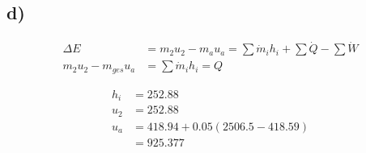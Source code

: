 

\subsection*{d)}

\begin{align*}
\Delta E &= m_{2} u_{2} - m_{a} u_{a} = \sum \dot{m}_{i} h_{i} + \sum \dot{Q} - \sum \dot{W} \\
m_{2} u_{2} - m_{ges} u_{a} &= \sum \dot{m}_{i} h_{i} = Q
\end{align*}

\begin{align*}
h_{i} &= 252.88 \\
u_{2} &= 252.88 \\
u_{a} &= 418.94 + 0.05 (2506.5 - 418.59) \\
&= 925.377
\end{align*}